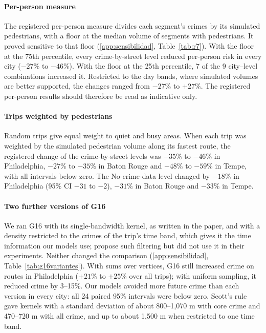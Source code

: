 \documentclass[preprint,12pt,authoryear]{elsarticle}
\begin{document}
\paragraph{Per-person measure} The registered per-person measure divides each segment's crimes by its simulated pedestrians, with a floor at the median volume of segments with pedestrians. It proved sensitive to that floor (\ref{app:sensibilidad}, Table~\ref{tab:r7}). With the floor at the 75th percentile, every crime-by-street level reduced per-person risk in every city ($-27\%$ to $-46\%$). With the floor at the 25th percentile, 7 of the 9 city--level combinations increased it. Restricted to the day bands, where simulated volumes are better supported, the changes ranged from $-27\%$ to $+27\%$. The registered per-person results should therefore be read as indicative only.

\paragraph{Trips weighted by pedestrians} Random trips give equal weight to quiet and busy areas. When each trip was weighted by the simulated pedestrian volume along its fastest route, the registered change of the crime-by-street levels was $-35\%$ to $-46\%$ in Philadelphia, $-27\%$ to $-35\%$ in Baton Rouge and $-48\%$ to $-59\%$ in Tempe, with all intervals below zero. The No-crime-data level changed by $-18\%$ in Philadelphia (95\% CI $-31$ to $-2$), $-31\%$ in Baton Rouge and $-33\%$ in Tempe.

\paragraph{Two further versions of G16} We ran G16 with its single-bandwidth kernel, as written in the paper, and with a density restricted to the crimes of the trip's time band, which gives it the time information our models use; \citet{galbrun2014safe} propose such filtering but did not use it in their experiments. Neither changed the comparison (\ref{app:sensibilidad}, Table~\ref{tab:g16variantes}). With sums over vertices, G16 still increased crime on routes in Philadelphia ($+21\%$ to $+25\%$ over all trips); with uniform sampling, it reduced crime by 3--15\%. Our models avoided more future crime than each version in every city: all 24 paired 95\% intervals were below zero. Scott's rule gave kernels with a standard deviation of about 800--1,070 m with core crime and 470--720 m with all crime, and up to about 1,500 m when restricted to one time band.
\end{document}
